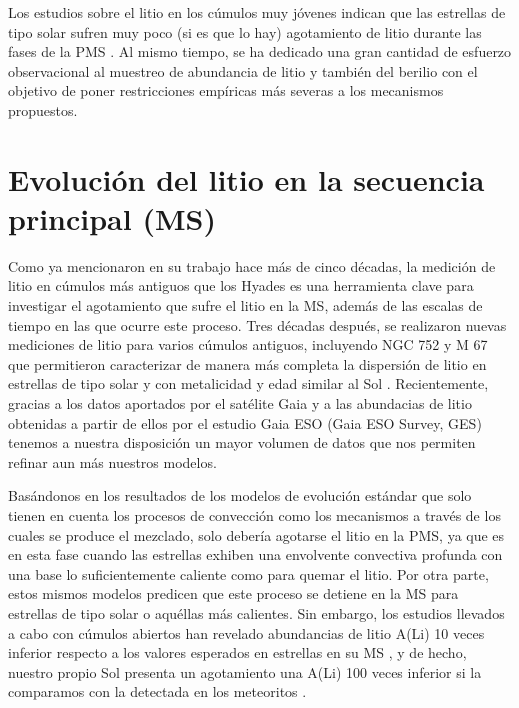 Los estudios sobre el litio en los cúmulos muy jóvenes indican que las estrellas de tipo solar sufren muy poco (si es que lo hay) agotamiento de litio durante las fases de la PMS  \citep{Jeffries2004}. Al mismo tiempo, se ha dedicado una gran cantidad de esfuerzo observacional al muestreo de abundancia de litio y también del berilio \citep{Mena2011, DelgadoMena2014} con el objetivo de poner restricciones empíricas más severas a los mecanismos propuestos.\par

\section{Evolución del litio en la secuencia principal (MS)}
Como ya mencionaron \cite{Zappala1972} en su trabajo hace más de cinco décadas, la medición de litio en cúmulos más antiguos que los Hyades es una herramienta clave para investigar el agotamiento que sufre el litio en la MS, además de las escalas de tiempo en las que ocurre este proceso. Tres décadas después, se realizaron nuevas mediciones de litio para varios cúmulos antiguos, incluyendo NGC 752 y M 67 \citep{Sestito2006} que permitieron caracterizar de manera más completa la dispersión de litio en estrellas de tipo solar y con metalicidad y edad similar al Sol \citep{Sestito2005}. Recientemente, gracias a los datos aportados por el satélite Gaia \citep{Brown2016, Brown2018, Brown2021, Brown2022} y a las abundacias de litio obtenidas a partir de ellos por el estudio Gaia ESO (Gaia ESO Survey, GES) \citep{Gilmore2012,Randich2013,Randich2022} tenemos a nuestra disposición un mayor volumen de datos que nos permiten refinar aun más nuestros modelos.\par

Basándonos en los resultados de los modelos de evolución estándar que solo tienen en cuenta los procesos de convección como los mecanismos a través de los cuales se produce el mezclado, solo debería agotarse el litio en la PMS, ya que es en esta fase cuando las estrellas exhiben una envolvente convectiva profunda con una base lo suficientemente caliente como para quemar el litio. Por otra parte, estos mismos modelos predicen que este proceso se detiene en la MS para estrellas de tipo solar o aquéllas más calientes. Sin embargo, los estudios llevados a cabo con cúmulos abiertos han revelado abundancias de litio A(Li) 10 veces inferior respecto a los valores esperados en estrellas en su MS \citep{Sestito2005}, y de hecho, nuestro propio Sol presenta un agotamiento una A(Li) 100 veces inferior si la comparamos con la detectada en los meteoritos \citep{Lodders2003}.\par

